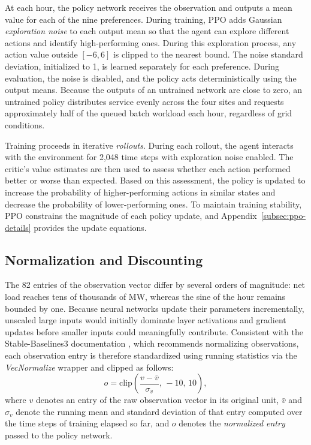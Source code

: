 \documentclass{UNCC-thesis}
\begin{document}
At each hour, the policy network receives the observation and outputs a mean value for each
of the nine preferences. During training, PPO adds Gaussian \emph{exploration noise} to each
output mean so that the agent can explore different actions and identify high-performing
ones. During this exploration process, any action value outside \([-6,6]\) is clipped to the
nearest bound. The noise standard deviation, initialized to 1, is learned separately for each
preference. During evaluation, the noise is disabled, and the policy acts deterministically
using the output means. Because the outputs of an untrained network are close to zero,
an untrained policy distributes service evenly across the four sites and requests
approximately half of the queued batch workload each hour, regardless of grid conditions.

Training proceeds in iterative \emph{rollouts}. During each rollout, the agent interacts with
the environment for 2,048 time steps with exploration noise enabled. The critic's value
estimates are then used to assess whether each action performed better or worse than
expected. Based on this assessment, the policy is updated to increase the probability of
higher-performing actions in similar states and decrease the probability of lower-performing
ones. To maintain training stability, PPO constrains the magnitude of each policy update, and
Appendix~\ref{subsec:ppo-details} provides the update equations.

\subsection{Normalization and Discounting}
\label{subsec:method-normalization}

The 82 entries of the observation vector differ by several orders of magnitude: net load
reaches tens of thousands of MW, whereas the sine of the hour remains bounded by one. Because
neural networks update their parameters incrementally, unscaled large inputs would initially
dominate layer activations and gradient updates before smaller inputs could meaningfully
contribute. Consistent with the Stable-Baselines3 documentation \cite{sb3tips}, which
recommends normalizing observations, each observation entry is therefore standardized using
running statistics via the \emph{VecNormalize} wrapper and clipped as follows:
\begin{equation}
  o=\mathrm{clip}\!\left(\frac{v-\bar v}{\sigma_v},\,-10,\,10\right),
  \label{eq:observation-normalization}
\end{equation}
where \(v\) denotes an entry of the raw observation vector in its original unit, \(\bar v\)
and \(\sigma_v\) denote the running mean and standard deviation of that entry computed over
the time steps of training elapsed so far, and \(o\) denotes the \emph{normalized entry} passed to
the policy network.
\end{document}

